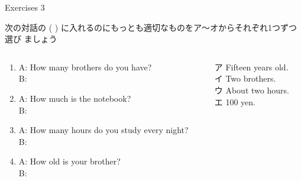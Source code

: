 \documentclass[aspectratio=169,xcolor={dvipsnames,table}]{beamer}
\begin{document}
\begin{frame}[plain]{Exercises 3}
 
 次の対話の ( ) に入れるのにもっとも適切なものをア～オからそれぞれ1つずつ選び
ましょう
\begin{columns}
\begin{column}{.65\textwidth}
\begin{enumerate}
 \item A: How many brothers do you have?\\
B: 
\item A: How much is the notebook? \\
B:   
 \item  A: How many hours do you study every night?\\ 
B:   
  \item A: How old is your brother?\\
B:  
\end{enumerate} 
\end{column}
\begin{column}{.35\textwidth}
\begin{tcolorbox}
 
ア Fifteen years old.\\
イ Two brothers.\\
ウ About two hours.\\
エ 100 yen.
\end{tcolorbox}
\hfill{}


\end{column}
\end{columns}

\end{frame}
\end{document}
